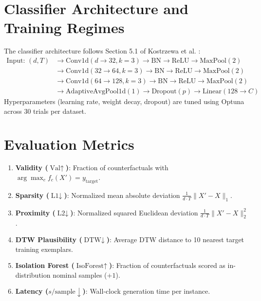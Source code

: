 \documentclass[11pt,a4paper]{report}
\begin{document}
\section{Classifier Architecture and Training Regimes}
The classifier architecture follows Section 5.1 of Kostrzewa et al. \cite{kostrzewa2026towards}:
\begin{align*}
    \text{Input: } (d, T) &\longrightarrow \text{Conv1d}(d \rightarrow 32, k=3) \rightarrow \text{BN} \rightarrow \text{ReLU} \rightarrow \text{MaxPool}(2) \\
    &\longrightarrow \text{Conv1d}(32 \rightarrow 64, k=3) \rightarrow \text{BN} \rightarrow \text{ReLU} \rightarrow \text{MaxPool}(2) \\
    &\longrightarrow \text{Conv1d}(64 \rightarrow 128, k=3) \rightarrow \text{BN} \rightarrow \text{ReLU} \rightarrow \text{MaxPool}(2) \\
    &\longrightarrow \text{AdaptiveAvgPool1d}(1) \longrightarrow \text{Dropout}(p) \longrightarrow \text{Linear}(128 \rightarrow C)
\end{align*}
Hyperparameters (learning rate, weight decay, dropout) are tuned using Optuna across 30 trials per dataset.

\section{Evaluation Metrics}
\begin{enumerate}
    \item \textbf{Validity ($\text{Val} \uparrow$)}: Fraction of counterfactuals with $\arg\max_c f_c(X') = y_{\text{target}}$.
    \item \textbf{Sparsity ($\text{L1} \downarrow$)}: Normalized mean absolute deviation $\frac{1}{d \cdot T} \|X' - X\|_1$.
    \item \textbf{Proximity ($\text{L2} \downarrow$)}: Normalized squared Euclidean deviation $\frac{1}{d \cdot T} \|X' - X\|_2^2$.
    \item \textbf{DTW Plausibility ($\text{DTW} \downarrow$)}: Average DTW distance to 10 nearest target training exemplars.
    \item \textbf{Isolation Forest ($\text{IsoForest} \uparrow$)}: Fraction of counterfactuals scored as in-distribution nominal samples ($+1$).
    \item \textbf{Latency ($s/\text{sample} \downarrow$)}: Wall-clock generation time per instance.
\end{enumerate}

\end{document}
